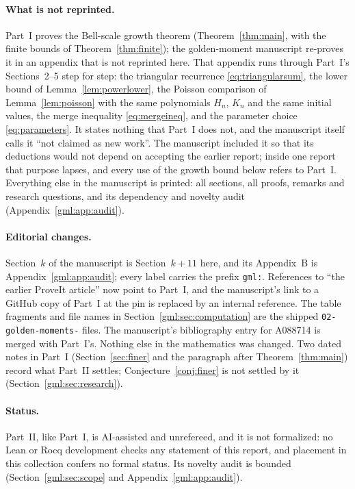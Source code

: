 \documentclass[11pt]{article}
\numberwithin{equation}{section}
\theoremstyle{definition}
\theoremstyle{remark}
\begin{document}
\paragraph{What is not reprinted.}
Part~I proves the Bell-scale growth theorem
(Theorem~\ref{thm:main}, with the finite bounds of
Theorem~\ref{thm:finite}); the golden-moment manuscript re-proves it in an
appendix that is not reprinted here. That appendix runs through Part~I's
Sections~2--5 step for step: the triangular recurrence
\eqref{eq:triangularsum}, the lower bound of Lemma~\ref{lem:powerlower},
the Poisson comparison of Lemma~\ref{lem:poisson} with the same
polynomials $H_n$, $K_n$ and the same initial values, the merge inequality
\eqref{eq:mergeineq}, and the parameter choice \eqref{eq:parameters}. It
states nothing that Part~I does not, and the manuscript itself calls it
``not claimed as new work''. The manuscript included it so that its
deductions would not depend on accepting the earlier report; inside one
report that purpose lapses, and every use of the growth bound below refers
to Part~I. Everything else in the manuscript is printed: all sections, all
proofs, remarks and research questions, and its dependency and novelty
audit (Appendix~\ref{gml:app:audit}).

\paragraph{Editorial changes.}
Section~$k$ of the manuscript is Section~$k+11$ here, and its Appendix~B
is Appendix~\ref{gml:app:audit}; every label carries the prefix
\texttt{gml:}. References to ``the earlier ProveIt article'' now point to
Part~I, and the manuscript's link to a GitHub copy of Part~I at the pin is
replaced by an internal reference. The table fragments and file names in
Section~\ref{gml:sec:computation} are the shipped
\texttt{02-golden-moments-} files. The manuscript's bibliography entry
for A088714 is merged with Part~I's. Nothing else in the mathematics was
changed. Two dated notes in Part~I (Section~\ref{sec:finer} and the
paragraph after Theorem~\ref{thm:main}) record what Part~II settles;
Conjecture~\ref{conj:finer} is not settled by it
(Section~\ref{gml:sec:research}).

\paragraph{Status.}
Part~II, like Part~I, is AI-assisted and unrefereed, and it is not
formalized: no Lean or Rocq development checks any statement of this
report, and placement in this collection confers no formal status. Its
novelty audit is bounded (Section~\ref{gml:sec:scope} and
Appendix~\ref{gml:app:audit}).
\end{document}
